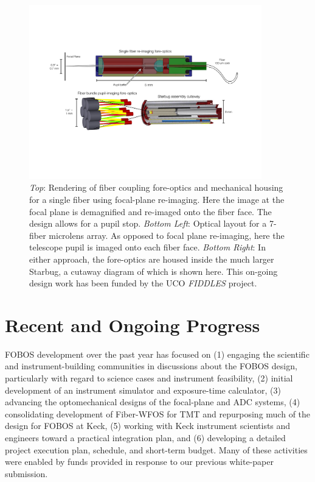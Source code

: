 

\begin{figure}[h!]
\includegraphics[width=0.9\textwidth]{figs/FOBOS_ForeOptics_v1.pdf}
\caption{\small {\it
Top}: Rendering of fiber coupling fore-optics and mechanical housing for a single fiber using focal-plane re-imaging.  Here the image at the focal plane is demagnified and re-imaged onto the fiber face.  The design allows for a pupil stop. {\it Bottom Left}: Optical layout for a 7-fiber microlens array.  As opposed to focal plane re-imaging, here the telescope pupil is imaged onto each fiber face.  {\it Bottom Right}: In either approach, the fore-optics are housed inside the much larger Starbug, a cutaway diagram of which is shown here. This on-going design work has been funded by the UCO \emph{FIDDLES} project.}
\label{fig:foreoptics}
\end{figure}


\section{Recent and Ongoing Progress}
\label{sec:progress}

FOBOS development over the past year has focused on (1) engaging the
scientific and instrument-building communities in discussions about
the FOBOS design, particularly with regard to science cases and
instrument feasibility, (2) initial development of an instrument
simulator and exposure-time calculator, (3) advancing the
optomechanical designs of the focal-plane and ADC systems, (4)
consolidating development of Fiber-WFOS for TMT and repurposing much
of the design for FOBOS at Keck, (5) working with Keck instrument
scientists and engineers toward a practical integration plan, and (6)
developing a detailed project execution plan, schedule, and
short-term budget. Many of these activities were enabled by funds
provided in response to our previous white-paper submission.

